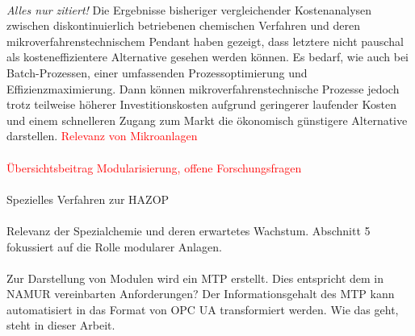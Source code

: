 \paragraph*{\cite{Sell_2013}}
\textit{Alles nur zitiert!} \hfill \newline
Die Ergebnisse bisheriger vergleichender Kostenanalysen zwischen diskontinuierlich betriebenen chemischen Verfahren und deren mikroverfahrenstechnischem Pendant haben gezeigt, dass letztere nicht pauschal als kosteneffizientere Alternative gesehen werden können. Es bedarf, wie auch bei Batch-Prozessen, einer umfassenden Prozessoptimierung und Effizienzmaximierung. Dann können mikroverfahrenstechnische Prozesse jedoch trotz teilweise höherer Investitionskosten aufgrund geringerer laufender Kosten und einem schnelleren Zugang zum Markt die ökonomisch günstigere Alternative darstellen. \textcolor{red}{Relevanz von Mikroanlagen}

\paragraph*{\cite{Urbas_2012}} \textcolor{red}{\"Ubersichtsbeitrag Modularisierung, offene Forschungsfragen}

\paragraph*{\cite{Vaidhyanathan1995}} Spezielles Verfahren zur HAZOP

\paragraph*{\cite{Wachsen_2015}} Relevanz der Spezialchemie und deren erwartetes Wachstum. Abschnitt 5 fokussiert auf die Rolle modularer Anlagen. 

\paragraph*{\cite{Wassilew2017}}

\paragraph*{\cite{Wassilew2016}}
Zur Darstellung von Modulen wird ein MTP erstellt. Dies entspricht dem in NAMUR vereinbarten Anforderungen? Der Informationsgehalt des MTP kann automatisiert in das Format von OPC UA transformiert werden. Wie das geht, steht in dieser Arbeit. 